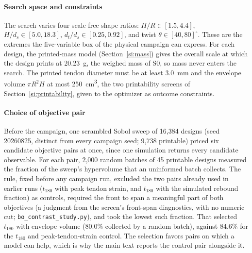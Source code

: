 \documentclass[11pt]{article}
\begin{document}
\paragraph{Search space and constraints} The search varies four
scale-free shape ratios: $H/R \in [1.5, 4.4]$, $H/d_s \in [5.0, 18.3]$,
$d_t/d_s \in [0.25, 0.92]$, and twist $\theta \in [40, 80]^\circ$. These
are the extremes the five-variable box of the physical campaign can
express. For each design, the printed-mass model
(Section~\ref{si:mass}) gives the overall scale at
which the design prints at \SI{20.23}{g}, the weighed mass of S0, so
mass never enters the search. The printed tendon diameter must be at
least \SI{3.0}{mm} and the envelope volume $\pi R^2 H$ at most
\SI{250}{cm^3}, the two printability screens of
Section~\ref{si:printability}, given to the optimizer as outcome
constraints.

\paragraph{Choice of objective pair} Before the campaign, one scrambled
Sobol sweep of 16,384 designs (seed 20260825, distinct from every
campaign seed; 9,738 printable) priced six candidate objective pairs at
once, since one simulation returns every candidate observable. For
each pair, 2,000 random batches of 45 printable designs measured the
fraction of the sweep's hypervolume that an uninformed batch collects.
The rule, fixed before any campaign run, excluded the two pairs already
used in earlier runs ($t_{180}$ with peak tendon strain, and $t_{180}$
with the simulated rebound fraction) as controls, required the front to
span a meaningful part of both
objectives (a judgment from the screen's front-span diagnostics, with no
numeric cut; \texttt{bo\_contrast\_study.py}), and took the lowest such
fraction. That selected $t_{180}$
with envelope volume (80.0\% collected by a random batch), against
84.6\% for the $t_{180}$ and peak-tendon-strain control. The selection
favors pairs on which a model can help, which is why the main text
reports the control pair alongside it.
\end{document}
